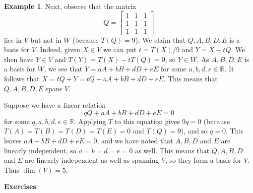 \documentclass{amsart}
\newcommand{\R}         {{\mathbb{R}}}
\newcommand{\bsm}       {\left[\begin{smallmatrix}}
\newcommand{\esm}       {\end{smallmatrix}\right]}
\renewcommand{\:}       {\colon}
\theoremstyle{definition}
\newtheorem{example}[theorem]{Example}
\begin{document}
\begin{example}
  Next, observe that the matrix 
  \[ Q = \bsm 1&1&1 \\ 1&1&1 \\ 1&1&1 \esm \]
  lies in $V$ but not in $W$ (because $T(Q)=9$).  We claim
  that $Q,A,B,D,E$ is a basis for $V$.  Indeed, given
  $X\in V$ we can put $t=T(X)/9$ and $Y=X-tQ$.  We then have
  $Y\in V$ and $T(Y)=T(X)-tT(Q)=0$, so $Y\in W$.  As
  $A,B,D,E$ is a basis for $W$, we see that $Y=aA+bB+dD+eE$
  for some $a,b,d,e\in\R$.  It follows that
  $X=tQ+Y=tQ+aA+bB+dD+eE$.  This means that $Q,A,B,D,E$
  spans $V$.

  Suppose we have a linear relation
  \[ qQ + aA + bB + dD + eE = 0 \]
  for some $q,a,b,d,e\in\R$.  Applying $T$ to this equation
  gives $9q=0$ (because $T(A)=T(B)=T(D)=T(E)=0$ and
  $T(Q)=9$), and so $q=0$.  This leaves $aA+bB+dD+eE=0$, and
  we have noted that $A,B,D$ and $E$ are linearly
  independent, so $a=b=d=e=0$ as well.  This means that
  $Q,A,B,D$ and $E$ are linearly independent as well as
  spanning $V$, so they form a basis for $V$.  Thus
  $\dim(V)=5$. 
\end{example}


\begin{center}
 \Large \textbf{Exercises}
\end{center}
\end{document}
